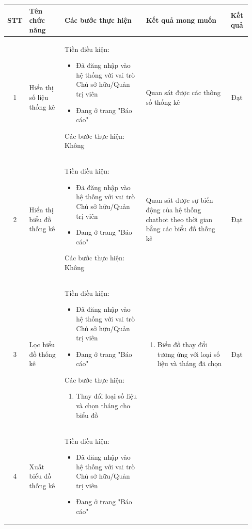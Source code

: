 \begin{longtable}{|c|m{2.5cm}|m{5.5cm}|m{4.5cm}|c|}
    \hline
    \textbf{STT} & \textbf{Tên chức năng} & \textbf{Các bước thực hiện} & \textbf{Kết quả mong muốn} & \textbf{Kết quả} \\
    \hline
    1 & 
    Hiển thị số liệu thống kê & 
    Tiền điều kiện:
    \begin{itemize}
        \item Đã đăng nhập vào hệ thống với vai trò Chủ sở hữu/Quản trị viên
        \item Đang ở trang "Báo cáo"
    \end{itemize}
    Các bước thực hiện: Không
    & 
    Quan sát được các thông số thống kê & Đạt \\
    \hline
    2 & 
    Hiển thị biểu đồ thống kê & 
    Tiền điều kiện:
    \begin{itemize}
        \item Đã đăng nhập vào hệ thống với vai trò Chủ sở hữu/Quản trị viên
        \item Đang ở trang "Báo cáo"
    \end{itemize}
    Các bước thực hiện: Không
    & 
        Quan sát được sự biến động của hệ thống chatbot theo thời gian bằng các biểu đồ thống kê
    & Đạt \\
    \hline
    3 & 
    Lọc biểu đồ thống kê & 
    Tiền điều kiện:
    \begin{itemize}
        \item Đã đăng nhập vào hệ thống với vai trò Chủ sở hữu/Quản trị viên
        \item Đang ở trang "Báo cáo"
    \end{itemize}
    Các bước thực hiện: 
    \begin{enumerate}[label=\arabic*.]
        \item Thay đổi loại số liệu và chọn tháng cho biểu đồ
    \end{enumerate}
    & 
    \begin{enumerate}[label=\arabic*.]
        \item Biểu đồ thay đổi tương ứng với loại số liệu và tháng đã chọn
    \end{enumerate} & Đạt \\
    \hline
    4 & 
    Xuất biểu đồ thống kê& 
    Tiền điều kiện:
    \begin{itemize}
        \item Đã đăng nhập vào hệ thống với vai trò Chủ sở hữu/Quản trị viên
        \item Đang ở trang "Báo cáo"

\end{itemize}
\end{longtable}
